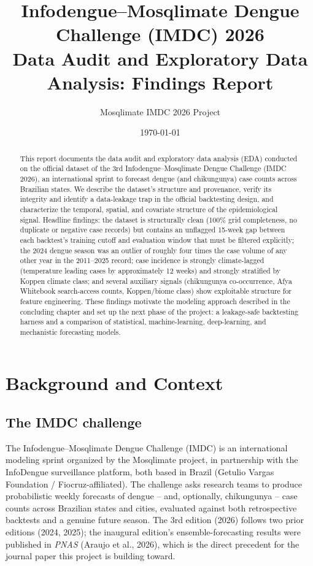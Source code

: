 \documentclass[11pt]{report}
\title{\textbf{Infodengue--Mosqlimate Dengue Challenge (IMDC) 2026\\[4pt]
\Large Data Audit and Exploratory Data Analysis: Findings Report}}
\author{Mosqlimate IMDC 2026 Project}
\date{\today}
\begin{document}
\maketitle
\thispagestyle{empty}

\begin{abstract}
\noindent
This report documents the data audit and exploratory data analysis (EDA) conducted on the official dataset of the 3rd Infodengue--Mosqlimate Dengue Challenge (IMDC 2026), an international sprint to forecast dengue (and chikungunya) case counts across Brazilian states. We describe the dataset's structure and provenance, verify its integrity and identify a data-leakage trap in the official backtesting design, and characterize the temporal, spatial, and covariate structure of the epidemiological signal. Headline findings: the dataset is structurally clean (100\% grid completeness, no duplicate or negative case records) but contains an unflagged 15-week gap between each backtest's training cutoff and evaluation window that must be filtered explicitly; the 2024 dengue season was an outlier of roughly four times the case volume of any other year in the 2011--2025 record; case incidence is strongly climate-lagged (temperature leading cases by approximately 12 weeks) and strongly stratified by Koppen climate class; and several auxiliary signals (chikungunya co-occurrence, Afya Whitebook search-access counts, Koppen/biome class) show exploitable structure for feature engineering. These findings motivate the modeling approach described in the concluding chapter and set up the next phase of the project: a leakage-safe backtesting harness and a comparison of statistical, machine-learning, deep-learning, and mechanistic forecasting models.
\end{abstract}

\tableofcontents

\chapter{Background and Context}

\section{The IMDC challenge}
The Infodengue--Mosqlimate Dengue Challenge (IMDC) is an international modeling sprint organized by the Mosqlimate project, in partnership with the InfoDengue surveillance platform, both based in Brazil (Getulio Vargas Foundation / Fiocruz-affiliated). The challenge asks research teams to produce probabilistic weekly forecasts of dengue -- and, optionally, chikungunya -- case counts across Brazilian states and cities, evaluated against both retrospective backtests and a genuine future season. The 3rd edition (2026) follows two prior editions (2024, 2025); the inaugural edition's ensemble-forecasting results were published in \emph{PNAS} (Araujo et al., 2026), which is the direct precedent for the journal paper this project is building toward.
\end{document}
